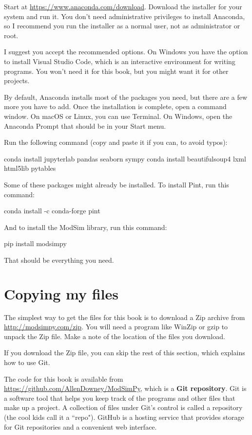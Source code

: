 \documentclass[12pt]{book}
\theoremstyle{exercise}
\begin{document}
Start at \url{https://www.anaconda.com/download}.  Download the installer for your system and run it.  You don't need administrative privileges to install Anaconda, so I recommend you run the installer as a normal user, not as administrator or root.

I suggest you accept the recommended options.
On Windows you have the option to install Visual Studio Code, which is an interactive environment for writing programs.  You won't need it for this book, but you might want it for other projects.

By default, Anaconda installs most of the packages you need, but there are a few more you have to add.  Once the installation is complete, open a command window.  On macOS or Linux, you can use Terminal.  On Windows, open the Anaconda Prompt that should be in your Start menu.

Run the following command (copy and paste it if you can, to avoid typos):

\begin{code}
conda install jupyterlab pandas seaborn sympy 
conda install beautifulsoup4 lxml html5lib pytables
\end{code}

Some of these packages might already be installed.  To install Pint, run this command:

\begin{code}
conda install -c conda-forge pint
\end{code}

And to install the ModSim library, run this command:

\begin{code}
pip install modsimpy
\end{code}

That should be everything you need.


\section{Copying my files}

The simplest way to get the files for this book is to download a Zip archive from \url{http://modsimpy.com/zip}.  You will need a program like WinZip or gzip to unpack the Zip file.  Make a note of the location of the files you download.

If you download the Zip file, you can skip the rest of this section, which explains how to use Git.

The code for this book is available from
\url{https://github.com/AllenDowney/ModSimPy}, which is a {\bf Git repository}.  Git is a software tool that helps you keep track of the programs and other files that make up a project.  A collection of files under Git's control is called a repository (the cool kids call it a ``repo").  GitHub is a hosting service that provides storage for Git repositories and a convenient web interface.
\end{document}
